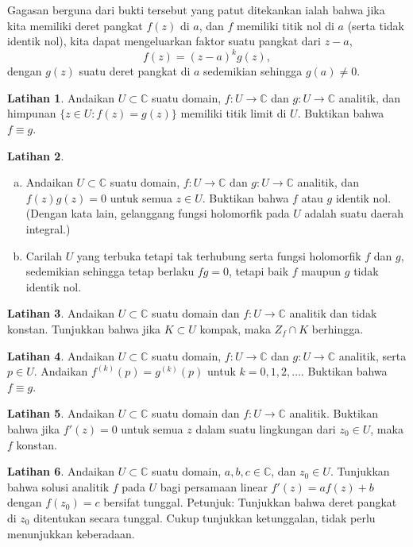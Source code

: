 \documentclass[12pt,openany]{book}
\newcommand{\C}{{\mathbb{C}}}
\theoremstyle{plain}
\theoremstyle{remark}
\theoremstyle{definition}
\newenvironment{exbox}{%
    \def\FrameCommand{\vrule width 1pt \relax\hspace{10pt}}%
    \MakeFramed{\advance\hsize-\width\FrameRestore}%
}{%
    \endMakeFramed
}
\newenvironment{exparts}{%
    \leavevmode\begin{enumerate}[a),noitemsep,topsep=0pt,parsep=0pt,partopsep=0pt]
}{%
    \end{enumerate}
}
\theoremstyle{exercise}
\newtheorem{exercise}{Latihan}[section]
\theoremstyle{example}
\begin{document}
Gagasan berguna dari bukti tersebut yang patut ditekankan
ialah bahwa jika kita memiliki deret pangkat $f(z)$ di $a$,
dan $f$ memiliki titik nol di $a$ (serta tidak identik nol),
kita dapat mengeluarkan faktor suatu pangkat dari $z-a$,
\begin{equation*}
f(z) = {(z-a)}^k g(z) ,
\end{equation*}
dengan $g(z)$ suatu deret pangkat di $a$ sedemikian sehingga $g(a) \neq 0$.

\begin{exbox}
\begin{exercise}
Andaikan $U \subset \C$ suatu domain,
$f \colon U \to \C$ dan $g \colon U \to \C$ analitik,
dan himpunan $\bigl\{ z \in U : f(z) = g(z) \bigr\}$ memiliki titik
limit di $U$.
Buktikan bahwa $f \equiv g$.
\end{exercise}

\begin{exercise}
\begin{exparts}
\item
Andaikan $U \subset \C$ suatu domain,
$f \colon U \to \C$ dan $g \colon U \to \C$ analitik,
dan $f(z)g(z) = 0$ untuk semua $z \in U$.
Buktikan bahwa $f$ atau $g$ identik nol.
(Dengan kata lain, gelanggang fungsi holomorfik pada $U$ adalah suatu daerah
integral.)
\item
Carilah $U$ yang terbuka tetapi tak terhubung serta fungsi holomorfik $f$ dan $g$,
sedemikian sehingga tetap berlaku $fg = 0$, tetapi baik $f$ maupun $g$ tidak identik nol.
\end{exparts}
\end{exercise}

\begin{exercise}
Andaikan $U \subset \C$ suatu domain dan $f \colon U \to \C$
analitik dan tidak konstan.  Tunjukkan bahwa jika $K \subset U$ kompak,
maka $Z_f \cap K$ berhingga.
\end{exercise}

\begin{exercise}
Andaikan $U \subset \C$ suatu domain, $f \colon U \to \C$ dan $g \colon U \to
\C$ analitik, serta $p \in U$.  Andaikan $f^{(k)}(p) = g^{(k)}(p)$
untuk $k=0,1,2,\ldots$.  Buktikan bahwa $f \equiv g$.
\end{exercise}

\begin{exercise}
Andaikan $U \subset \C$ suatu domain dan $f \colon U \to \C$ analitik.
Buktikan bahwa jika $f'(z) = 0$ untuk
semua $z$ dalam suatu lingkungan dari $z_0 \in U$, maka $f$ konstan.
\end{exercise}

\begin{exercise}
Andaikan $U \subset \C$ suatu domain, $a, b, c \in \C$, dan $z_0 \in U$.
Tunjukkan bahwa
solusi analitik $f$ pada $U$ bagi persamaan linear $f'(z) = a f(z) + b$
dengan $f(z_0) = c$ bersifat tunggal.  Petunjuk: Tunjukkan bahwa deret pangkat di $z_0$ ditentukan secara
tunggal.  Cukup tunjukkan ketunggalan, tidak perlu menunjukkan keberadaan.
\end{exercise}
\end{exbox}
\end{document}
